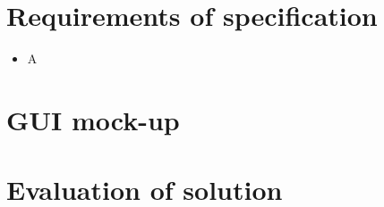 \documentclass{article}
\begin{document}
\section{Requirements of specification}

\begin{itemize}
	\item A	
\end{itemize}

\section{GUI mock-up}

\section{Evaluation of solution}
\end{document}
